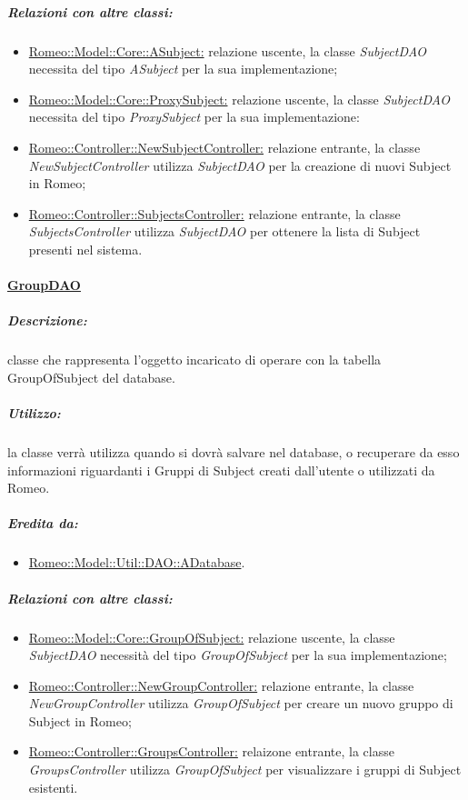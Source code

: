 			\subparagraph{Relazioni con altre classi:}
				\begin{itemize}
					\item \hyperref[]{Romeo::Model::Core::ASubject:} relazione uscente, la classe \textsl{SubjectDAO} necessita del tipo \textsl{ASubject} per la sua implementazione;
					
					\item \hyperref[]{Romeo::Model::Core::ProxySubject:} relazione uscente, la classe \textsl{SubjectDAO} necessita del tipo \textsl{ProxySubject} per la sua implementazione:
					
					\item \hyperref[]{Romeo::Controller::NewSubjectController:} relazione entrante, la classe \textsl{NewSubjectController} utilizza \textsl{SubjectDAO} per la creazione di nuovi Subject\g{} in Romeo\g{};
					
					\item \hyperref[]{Romeo::Controller::SubjectsController:} relazione entrante, la classe \textsl{SubjectsController} utilizza \textsl{SubjectDAO} per ottenere la lista di Subject\g{} presenti nel sistema.
					
				\end{itemize}
		
		\paragraph{\underline{GroupDAO}}
		\label{dao::groupdao}
			\subparagraph{Descrizione:} classe che rappresenta l’oggetto incaricato di operare con la tabella GroupOfSubject del database.
			
			\subparagraph{Utilizzo:} la classe verrà utilizza quando si dovrà salvare nel database, o recuperare da esso informazioni riguardanti i Gruppi di Subject creati dall'utente o utilizzati da Romeo\g{}.
			
			\subparagraph{Eredita da:}
				\begin{itemize}
					\item \hyperref[romeo::model::util::dao]{Romeo::Model::Util::DAO::ADatabase}.			
				\end{itemize}
				
			\subparagraph{Relazioni con altre classi:}
				\begin{itemize}
					\item \hyperref[]{Romeo::Model::Core::GroupOfSubject:} relazione uscente, la classe \textsl{SubjectDAO} necessità del tipo \textsl{GroupOfSubject} per la sua implementazione;
					
					\item \hyperref[]{Romeo::Controller::NewGroupController:} relazione entrante, la classe \textsl{NewGroupController} utilizza \textsl{GroupOfSubject} per creare un nuovo gruppo di Subject\g{} in Romeo\g{};
					
					\item \hyperref[]{Romeo::Controller::GroupsController:} relaizone entrante, la classe \textsl{GroupsController} utilizza \textsl{GroupOfSubject} per visualizzare i gruppi di Subject\g{} esistenti.
				\end{itemize}
				
